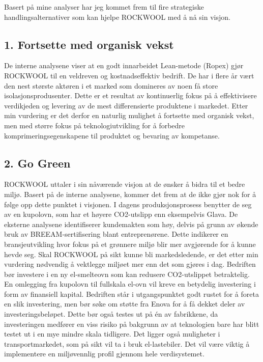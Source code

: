 Basert på mine analyser har jeg kommet frem til fire strategiske handlingsalternativer som kan hjelpe ROCKWOOL med å nå sin visjon.

\subsection*{1. Fortsette med organisk vekst}
De interne analysene viser at en godt innarbeidet Lean-metode (Ropex) gjør ROCKWOOL til en veldreven og kostnadseffektiv bedrift. De har i flere år vært den nest største aktøren i et marked som domineres av noen få store isolasjonsprodusenter. Dette er et resultat av kontinuerlig fokus på å effektivisere verdikjeden og levering av de mest differensierte produktene i markedet. Etter min vurdering er det derfor en naturlig mulighet å fortsette med organisk vekst, men med større fokus på teknologiutvikling for å forbedre komprimeringsegenskapene til produktet og bevaring av kompetanse.

\subsection*{2. Go Green}
ROCKWOOL uttaler i sin nåværende visjon at de ønsker å bidra til et bedre miljø. Basert på de interne analysene, kommer det frem at de ikke gjør nok for å følge opp dette punktet i visjonen. I dagens produksjonsprosess benytter de seg av en kupolovn, som har et høyere CO2-utslipp enn eksempelvis Glava. De eksterne analysene identifiserer kundemakten som høy, delvis på grunn av økende bruk av BREEAM-sertifisering blant entreprenørene. Dette indikerer en bransjeutvikling hvor fokus på et grønnere miljø blir mer avgjørende for å kunne hevde seg. Skal ROCKWOOL på sikt kunne bli markedsledende, er det etter min vurdering nødvendig å vektlegge miljøet mer enn det som gjøres i dag. Bedriften bør investere i en ny el-smelteovn som kan redusere CO2-utslippet betraktelig. En omlegging fra kupolovn til fullskala el-ovn vil kreve en betydelig investering i form av finansiell kapital. Bedriften står i utgangspunktet godt rustet for å foreta en slik investering, men bør søke om støtte fra Enova for å få dekket deler av investeringsbeløpet. Dette bør også testes ut på én av fabrikkene, da investeringen medfører en viss risiko på bakgrunn av at teknologien bare har blitt testet ut i en mye mindre skala tidligere.  Det ligger også muligheter i transportmarkedet, som på sikt vil ta i bruk el-lastebiler. Det vil være viktig å implementere en miljøvennlig profil gjennom hele verdisystemet.  

